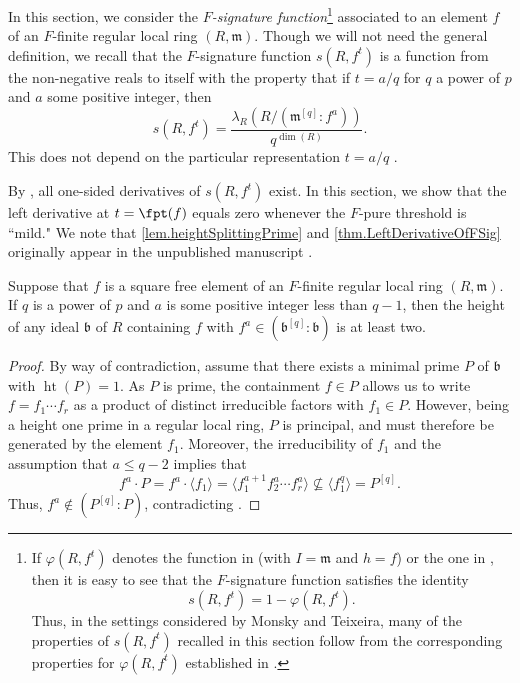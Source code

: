 \documentclass[11pt]{amsart}
\begin{document}
In this section, we consider the \emph{$F$-signature function}\footnote{If $\varphi(R, f^t)$ denotes the function in \cite[Definition 2.4]{MonskyTeixeiraPFractals1} (with $I={\mathfrak{m}}$ and $h=f$) or the one in \cite[Definition 1.1]{MonskyTeixeiraPFractals2}, then it is easy to see that the $F$-signature function satisfies the identity \[ s(R, f^t) = 1 - \varphi(R,f^t). \]   Thus, in the settings considered by Monsky and Teixeira, many of the properties of $s(R, f^t)$ recalled in this section follow from the corresponding properties for $\varphi(R, f^t)$ established in \cite{MonskyTeixeiraPFractals1, MonskyTeixeiraPFractals2}.}
associated to an element $f$ of an $F$-finite regular local ring $(R, {\mathfrak{m}})$.  Though we will not need the general definition, we recall that the $F$-signature function $s(R,f^t)$ is a function from the non-negative reals to itself with the property that  if $t = a/q$ for $q$ a power of $p$ and $a$ some positive integer, then
\begin{equation}
\label{specialInputFSignature: e}
s(R, f^{t}) = \frac{ \lambda_R\left(R / ({\mathfrak{m}}^{[q]} : f^a )\right) }{ q^{\dim(R)}}. \end{equation}
 This does not depend on the  particular representation $t = a/q$ \cite[Proposition 4.1]{BlickleSchwedeTuckerTestIdeals2} .

By \cite{BlickleSchwedeTuckerTestIdeals2}, all one-sided derivatives of $s(R, f^t)$ exist.  In this section, we show that the left derivative at $t=\fpt(f)$ equals zero whenever the $F$-pure threshold is ``mild."  We note that  \autoref{lem.heightSplittingPrime} and  \autoref{thm.LeftDerivativeOfFSig} originally appear in the unpublished manuscript \cite{CantonLeftDerivativeOfFSignature}.

  \begin{lemma}
 
\label{lem.heightSplittingPrime}  Suppose that $f$ is a square free element of an $F$-finite regular local ring $(R, {\mathfrak{m}})$.  If $q$ is a power of $p$ and $a$ is some positive integer less than $q-1$,  then the height of any ideal ${\mathfrak{b}}$ of $R$ containing $f$ with $f^a \in ({\mathfrak{b}}^{[q]}: {\mathfrak{b}})$ is at least two.
\end{lemma}

\begin{proof}
By way of contradiction, assume that there exists a minimal prime $P$ of ${\mathfrak{b}}$ with $\operatorname{ht}(P) = 1$.  As $P$ is prime, the containment $f \in P$ allows us to write $f = f_1 \cdots f_r$ as a product of distinct irreducible factors with $f_1 \in P$.  However, being a height one prime in a regular local ring, $P$ is principal, and must therefore be generated by the element $f_1$.  Moreover, the irreducibility of $f_1$ and the assumption that $a \leq q-2$ implies that
\[ f^a \cdot P =
f^a \cdot \langle f_1 \rangle = \langle f_1^{a+1} f_2^a \cdots f_r^a \rangle \not \subseteq  \langle f_1^q \rangle = P^{[q]}.
\]
Thus, $f^a \notin { \left({{P^{[q]}}}:{{P}} \right)}$, contradicting \cite[Proposition 4.10]{SchwedeCentersOfFPurity}.
\end{proof}
\end{document}
